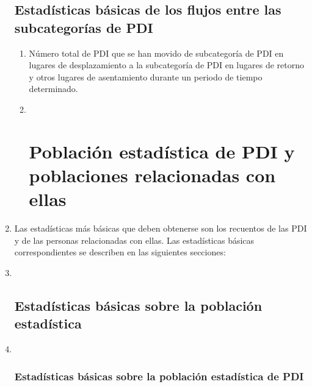 \documentclass[
]{book}
\begin{document}
\begin{enumerate}
{  \subsection{Estadísticas básicas de los flujos entre las subcategorías de PDI}\label{estaduxedsticas-buxe1sicas-de-los-flujos-entre-las-subcategoruxedas-de-pdi}}

  \begin{enumerate}
  \def\labelenumii{\arabic{enumii}.}
  \item
    Número total de PDI que se han movido de subcategoría de PDI en lugares de desplazamiento a la subcategoría de PDI en lugares de retorno y otros lugares de asentamiento durante un periodo de tiempo determinado.
  \item ~
    \hypertarget{poblaciuxf3n-estaduxedstica-de-pdi-y-poblaciones-relacionadas-con-ellas}{%
    \section{Población estadística de PDI y poblaciones relacionadas con ellas}\label{poblaciuxf3n-estaduxedstica-de-pdi-y-poblaciones-relacionadas-con-ellas}}
  \end{enumerate}
\item
  Las estadísticas más básicas que deben obtenerse son los recuentos de las PDI y de las personas relacionadas con ellas. Las estadísticas básicas correspondientes se describen en las siguientes secciones:
\item ~
  \hypertarget{estaduxedsticas-buxe1sicas-sobre-la-poblaciuxf3n-estaduxedstica}{%
  \subsection{Estadísticas básicas sobre la población estadística}\label{estaduxedsticas-buxe1sicas-sobre-la-poblaciuxf3n-estaduxedstica}}
\item ~
  \hypertarget{estaduxedsticas-buxe1sicas-sobre-la-poblaciuxf3n-estaduxedstica-de-pdi}{%
  \subsubsection{Estadísticas básicas sobre la población estadística de PDI}\label{estaduxedsticas-buxe1sicas-sobre-la-poblaciuxf3n-estaduxedstica-de-pdi}}


\end{enumerate}
\end{document}

